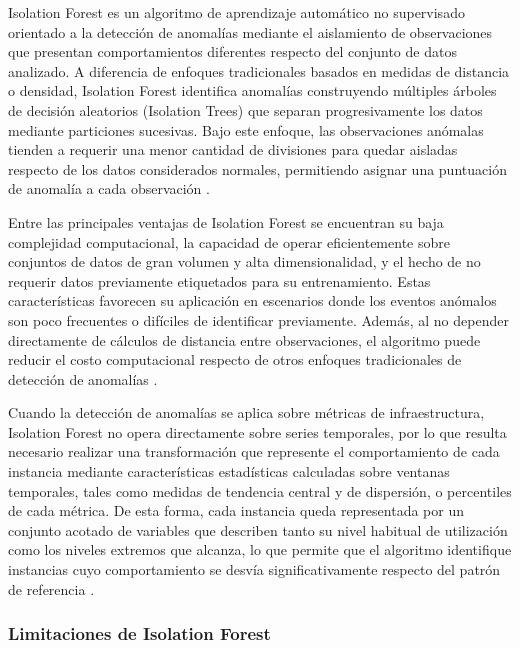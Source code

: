 Isolation Forest es un algoritmo de aprendizaje automático no supervisado orientado a la detección de anomalías mediante el aislamiento de observaciones que presentan comportamientos diferentes respecto del conjunto de datos analizado. A diferencia de enfoques tradicionales basados en medidas de distancia o densidad, Isolation Forest identifica anomalías construyendo múltiples árboles de decisión aleatorios (Isolation Trees) que separan progresivamente los datos mediante particiones sucesivas. Bajo este enfoque, las observaciones anómalas tienden a requerir una menor cantidad de divisiones para quedar aisladas respecto de los datos considerados normales, permitiendo asignar una puntuación de anomalía a cada observación \parencite{Chen2023}.

Entre las principales ventajas de Isolation Forest se encuentran su baja complejidad computacional, la capacidad de operar eficientemente sobre conjuntos de datos de gran volumen y alta dimensionalidad, y el hecho de no requerir datos previamente etiquetados para su entrenamiento. Estas características favorecen su aplicación en escenarios donde los eventos anómalos son poco frecuentes o difíciles de identificar previamente. Además, al no depender directamente de cálculos de distancia entre observaciones, el algoritmo puede reducir el costo computacional respecto de otros enfoques tradicionales de detección de anomalías \parencite{Chen2023}.

Cuando la detección de anomalías se aplica sobre métricas de infraestructura, Isolation Forest no opera directamente sobre series temporales, por lo que resulta necesario realizar una transformación que represente el comportamiento de cada instancia mediante características estadísticas calculadas sobre ventanas temporales, tales como medidas de tendencia central y de dispersión, o percentiles de cada métrica. De esta forma, cada instancia queda representada por un conjunto acotado de variables que describen tanto su nivel habitual de utilización como los niveles extremos que alcanza, lo que permite que el algoritmo identifique instancias cuyo comportamiento se desvía significativamente respecto del patrón de referencia \parencite{Chen2023}.

\subsubsection{Limitaciones de Isolation Forest}

